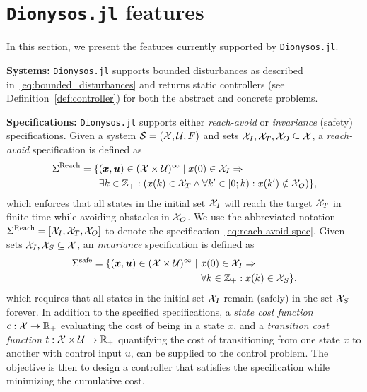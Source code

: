 \documentclass{juliacon}
\begin{document}


\section{\texttt{Dionysos.jl} features}
\label{sec:functionalities}
In this section, we present the features currently supported by \texttt{Dionysos.jl}.

\vskip 6pt
\textbf{Systems:} 
\texttt{Dionysos.jl} supports bounded disturbances as described in~\eqref{eq:bounded_disturbances} and returns static controllers (see Definition~\ref{def:controller}) for both the abstract and concrete problems.

\vskip 6pt
\textbf{Specifications:}
\texttt{Dionysos.jl} supports either \emph{reach-avoid} or \emph{invariance} (safety) specifications. 
Given a system $\mathcal{S} = (\mathcal{X},\mathcal{U},F)$ and sets $\mathcal{X}_I, \mathcal{X}_T, \mathcal{X}_O \subseteq \mathcal{X}$, a \emph{reach-avoid} specification is defined as
\begin{align}
\Sigma^{\text{Reach}} = \{ &(\boldsymbol{x},\boldsymbol{u}) \in (\mathcal{X} \times \mathcal{U})^\infty \mid x(0) \in \mathcal{X}_I \Rightarrow \nonumber \\
&\exists k \in \mathbb{Z}_+ : \left(x(k) \in \mathcal{X}_T \land \forall k' \in [0;k):x(k')\notin \mathcal{X}_O\right) \}, \label{eq:reach-avoid-spec}
\end{align}
which enforces that all states in the initial set $\mathcal{X}_I$ will reach the target $\mathcal{X}_T$ in finite time while avoiding obstacles in $\mathcal{X}_O$. We use the abbreviated notation $\Sigma^{\text{Reach}}=[\mathcal{X}_I,\mathcal{X}_T,\mathcal{X}_O]$ to denote the specification~\eqref{eq:reach-avoid-spec}. 
Given sets $\mathcal{X}_I,\mathcal{X}_S\subseteq \mathcal{X}$, an \emph{invariance} specification is defined as
\begin{align}
    \Sigma^{\text{safe}} = \{(\boldsymbol{x},\boldsymbol{u})\in (\mathcal{X}\times \mathcal{U})^{\infty}\mid\ &x(0)\in \mathcal{X}_I \Rightarrow \nonumber \\
    &\forall k \in \mathbb{Z}_+: x(k)\in \mathcal{X}_S\}, \label{eq:invariance-spec} 
\end{align}
which requires that all states in the initial set $\mathcal{X}_I$ remain (safely) in the set $\mathcal{X}_S$ forever.
In addition to the specified specifications, a \emph{state cost function} $c:\mathcal{X}\rightarrow \mathbb{R}_+$ evaluating the cost of being in a state $x$, and a \emph{transition cost function} $t:\mathcal{X}\times \mathcal{U}\rightarrow \mathbb{R}_+$ quantifying the cost of transitioning from one state $x$ to another with control input $u$, can be supplied to the control problem. The objective is then to design a controller that satisfies the specification while minimizing the cumulative cost.
\end{document}
